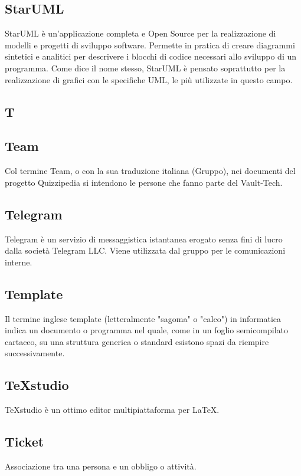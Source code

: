 \subsection{StarUML}
StarUML è un'applicazione completa e Open Source per la realizzazione di modelli e progetti di sviluppo software. Permette in pratica di creare diagrammi sintetici e analitici per descrivere i blocchi di codice necessari allo sviluppo di un programma. Come dice il nome stesso, StarUML è pensato soprattutto per la realizzazione di grafici con le specifiche UML, le più utilizzate in questo campo.

\newpage

\begin{center}
\Huge\section{\uppercase{T}}
\end{center}

\subsection{Team}
Col termine Team, o con la sua traduzione italiana (Gruppo), nei documenti del progetto
Quizzipedia si intendono le persone che fanno parte del Vault-Tech.


\subsection{Telegram}
Telegram è un servizio di messaggistica istantanea erogato senza fini di lucro dalla società Telegram LLC. Viene utilizzata dal gruppo per le comunicazioni interne.

\subsection{Template}
Il termine inglese template (letteralmente "sagoma" o "calco") in informatica
indica un documento o programma nel quale, come in un foglio semicompilato
cartaceo, su una struttura generica o standard esistono spazi da riempire
successivamente.

\subsection{TeXstudio}
TeXstudio è un ottimo editor multipiattaforma per LaTeX.

\subsection{Ticket}
Associazione tra una persona e un obbligo o attività.

